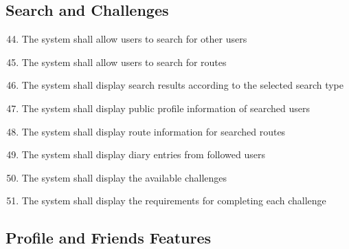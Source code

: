 \subsection{Search and Challenges}

\begin{enumerate}[label=\textbf{FR\arabic*}, ref=FR\arabic*]

\setcounter{enumi}{43}

\item \label{fr-smartphone:search-users}
The system shall allow users to search for other users

\item \label{fr-smartphone:search-routes}
The system shall allow users to search for routes

\item \label{fr-smartphone:search-results}
The system shall display search results according to the selected search type

\item \label{fr-smartphone:user-profile-display}
The system shall display public profile information of searched users

\item \label{fr-smartphone:searched-route-info}
The system shall display route information for searched routes

\item \label{fr-smartphone:followed-diaries}
The system shall display diary entries from followed users

\item \label{fr-smartphone:available-challenges}
The system shall display the available challenges

\item \label{fr-smartphone:challenge-requirements}
The system shall display the requirements for completing each challenge

\end{enumerate}





\subsection{Profile and Friends Features}

